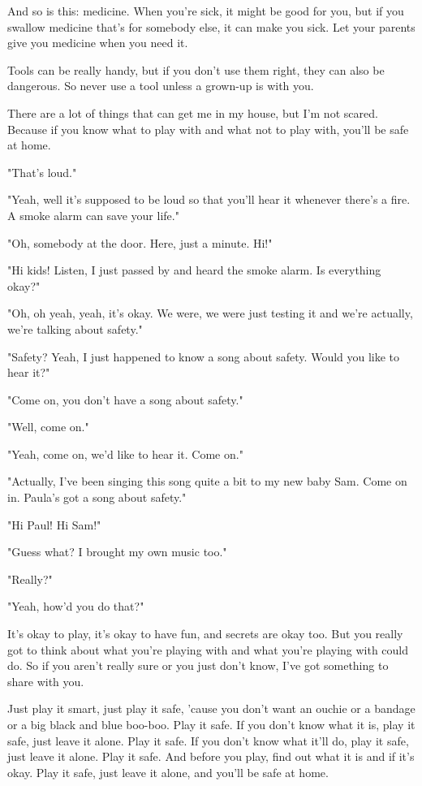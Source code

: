 And so is this: medicine. When you're sick, it might be good for you, but if you swallow medicine that's for somebody else, it can make you sick. Let your parents give you medicine when you need it.

Tools can be really handy, but if you don't use them right, they can also be dangerous. So never use a tool unless a grown-up is with you.

There are a lot of things that can get me in my house, but I'm not scared. Because if you know what to play with and what not to play with, you'll be safe at home.

"That's loud."

"Yeah, well it's supposed to be loud so that you'll hear it whenever there's a fire. A smoke alarm can save your life."

"Oh, somebody at the door. Here, just a minute. Hi!"

"Hi kids! Listen, I just passed by and heard the smoke alarm. Is everything okay?"

"Oh, oh yeah, yeah, it's okay. We were, we were just testing it and we're actually, we're talking about safety."

"Safety? Yeah, I just happened to know a song about safety. Would you like to hear it?"

"Come on, you don't have a song about safety."

"Well, come on."

"Yeah, come on, we'd like to hear it. Come on."

"Actually, I've been singing this song quite a bit to my new baby Sam. Come on in. Paula's got a song about safety."

"Hi Paul! Hi Sam!"

"Guess what? I brought my own music too."

"Really?"

"Yeah, how'd you do that?"

It's okay to play, it's okay to have fun, and secrets are okay too. But you really got to think about what you're playing with and what you're playing with could do. So if you aren't really sure or you just don't know, I've got something to share with you.

Just play it smart, just play it safe, 'cause you don't want an ouchie or a bandage or a big black and blue boo-boo. Play it safe. If you don't know what it is, play it safe, just leave it alone. Play it safe. If you don't know what it'll do, play it safe, just leave it alone. Play it safe. And before you play, find out what it is and if it's okay. Play it safe, just leave it alone, and you'll be safe at home.

